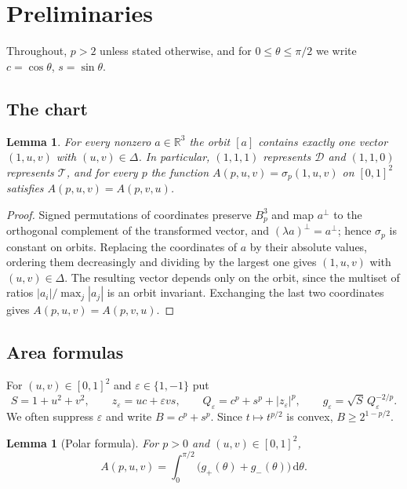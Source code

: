 \documentclass[11pt]{amsart}
\newtheorem{lemma}[theorem]{Lemma}
\theoremstyle{definition}
\theoremstyle{remark}
\numberwithin{equation}{section}
\newcommand{\R}{\mathbb{R}}
\newcommand{\cD}{\mathcal{D}}
\newcommand{\cT}{\mathcal{T}}
\newcommand{\dd}{\,\mathrm{d}}
\newcommand{\ve}{\varepsilon}
\begin{document}
\section{Preliminaries}\label{sec:prelim}

Throughout, $p>2$ unless stated otherwise, and for $0\le\theta\le\pi/2$ we write $c=\cos\theta$, $s=\sin\theta$.

\subsection{The chart}

\begin{lemma}\label{lem:chart}
For every nonzero $a\in\R^3$ the orbit $[a]$ contains exactly one vector $(1,u,v)$ with $(u,v)\in\Delta$. In particular, $(1,1,1)$ represents $\cD$ and $(1,1,0)$ represents $\cT$, and for every $p$ the function $A(p,u,v)=\sigma_p(1,u,v)$ on $[0,1]^2$ satisfies $A(p,u,v)=A(p,v,u)$.
\end{lemma}

\begin{proof}
Signed permutations of coordinates preserve $B_p^3$ and map $a^\perp$ to the orthogonal complement of the transformed vector, and $(\lambda a)^\perp=a^\perp$; hence $\sigma_p$ is constant on orbits. Replacing the coordinates of $a$ by their absolute values, ordering them decreasingly and dividing by the largest one gives $(1,u,v)$ with $(u,v)\in\Delta$. The resulting vector depends only on the orbit, since the multiset of ratios $|a_i|/\max_j|a_j|$ is an orbit invariant. Exchanging the last two coordinates gives $A(p,u,v)=A(p,v,u)$.
\end{proof}

\subsection{Area formulas}

For $(u,v)\in[0,1]^2$ and $\ve\in\{1,-1\}$ put
\begin{equation}\label{eq:defs}
S=1+u^2+v^2,\qquad z_\ve=uc+\ve vs,\qquad Q_\ve=c^p+s^p+|z_\ve|^p,\qquad g_\ve=\sqrt S\,Q_\ve^{-2/p}.
\end{equation}
We often suppress $\ve$ and write $B=c^p+s^p$. Since $t\mapsto t^{p/2}$ is convex, $B\ge 2^{1-p/2}$.

\begin{lemma}[Polar formula]\label{lem:polar}
For $p>0$ and $(u,v)\in[0,1]^2$,
\begin{equation}\label{eq:polar}
A(p,u,v)=\int_0^{\pi/2}\bigl(g_+(\theta)+g_-(\theta)\bigr)\dd\theta.
\end{equation}
\end{lemma}
\end{document}
